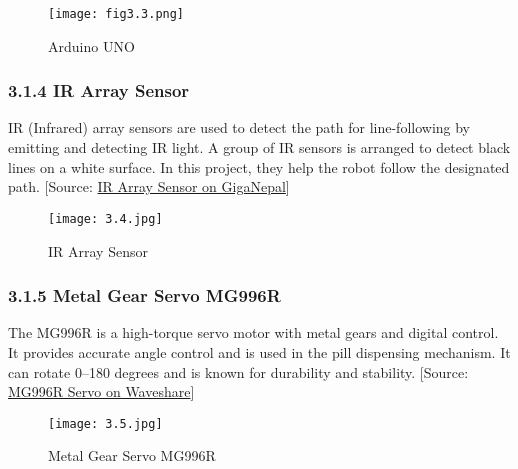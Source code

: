 \begin{figure}[H]
    \centering
    \texttt{[image: fig3.3.png]}
    \caption{Arduino UNO}
    \label{fig:3.3}
\end{figure}

\subsubsection*{3.1.4 IR Array Sensor}
IR (Infrared) array sensors are used to detect the path for line-following by emitting and detecting IR light. A group of IR sensors is arranged to detect black lines on a white surface. In this project, they help the robot follow the designated path. [Source: \href{https://www.giganepal.com/product/ir-sensor-array-module-4-way/?v=584a79c5e916}{IR Array Sensor on GigaNepal}]

\begin{figure}[H]
    \centering
    \texttt{[image: 3.4.jpg]}
    \caption{IR Array Sensor}
    \label{fig:3.4}
\end{figure}

\subsubsection*{3.1.5 Metal Gear Servo MG996R}
The MG996R is a high-torque servo motor with metal gears and digital control. It provides accurate angle control and is used in the pill dispensing mechanism. It can rotate 0–180 degrees and is known for durability and stability. [Source: \href{https://www.waveshare.com/mg996r-servo.htm}{MG996R Servo on Waveshare}]

\begin{figure}[H]
    \centering
    \texttt{[image: 3.5.jpg]}
    \caption{Metal Gear Servo MG996R}
    \label{fig:3.5}
\end{figure}
